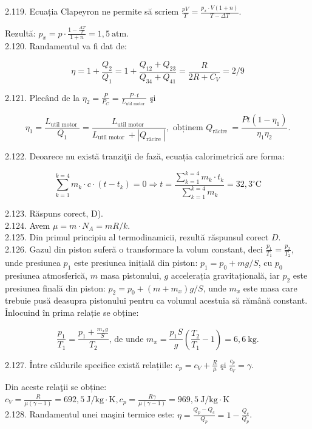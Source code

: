 \documentclass[10pt]{article}
\begin{document}
2.119. Ecuația Clapeyron ne permite să scriem $\frac{p V}{T}=\frac{p_{x} \cdot V(1+n)}{T-\Delta T}$.

Rezultă: $p_{x}=p \cdot \frac{1-\frac{\Delta T}{T}}{1+n}=1,5 \mathrm{~atm}$.\\
2.120. Randamentul va fi dat de:

$$
\eta=1+\frac{Q_{2}}{Q_{1}}=1+\frac{Q_{12}+Q_{23}}{Q_{34}+Q_{41}}=\frac{R}{2 R+C_{V}}=2 / 9
$$

2.121. Plecând de la $\eta_{2}=\frac{P}{P_{C}}=\frac{P \cdot t}{L_{\text {util motor }}}$ şi

$$
\eta_{1}=\frac{L_{\text {util motor }}}{Q_{1}}=\frac{L_{\text {util motor }}}{L_{\text {util motor }}+\left|Q_{\text {răcire }}\right|}, \text { obținem } Q_{\text {rācire }}=\frac{P t\left(1-\eta_{1}\right)}{\eta_{1} \eta_{2}} .
$$

2.122. Deoarece nu există tranziţii de fază, ecuația calorimetrică are forma:

$$
\sum_{k=1}^{k=4} m_{k} \cdot c \cdot\left(t-t_{k}\right)=0 \Rightarrow t=\frac{\sum_{k=1}^{k=4} m_{k} \cdot t_{k}}{\sum_{k=1}^{k=4} m_{k}}=32,3^{\circ} \mathrm{C}
$$

2.123. Răspuns corect, D).\\
2.124. Avem $\mu=m \cdot N_{A}=m R / k$.\\
2.125. Din primul principiu al termodinamicii, rezultă răspunsul corect $D$.\\
2.126. Gazul din piston suferă o transformare la volum constant, deci $\frac{p_{1}}{T_{1}}=\frac{p_{2}}{T_{2}}$, unde presiunea $p_{1}$ este presiunea inițială din piston: $p_{1}=p_{0}+m g / S$, cu $p_{0}$ presiunea atmosferică, $m$ masa pistonului, $g$ accelerația gravitațională, iar $p_{2}$ este presiunea finală din piston: $p_{2}=p_{0}+\left(m+m_{x}\right) g / S$, unde $m_{x}$ este masa care trebuie pusă deasupra pistonului pentru ca volumul acestuia să rămână constant. Înlocuind în prima relație se obține:

$$
\frac{p_{1}}{T_{1}}=\frac{p_{1}+\frac{m_{x} g}{S}}{T_{2}} \text {, de unde } m_{x}=\frac{p_{1} S}{g}\left(\frac{T_{2}}{T_{1}}-1\right)=6,6 \mathrm{~kg} .
$$

2.127. Între căldurile specifice există relațiile: $c_{p}=c_{V}+\frac{R}{\mu}$ şi $\frac{c_{p}}{c_{V}}=\gamma$.

Din aceste relaţii se obține:\\
$c_{V}=\frac{R}{\mu(\gamma-1)}=692,5 \mathrm{~J} / \mathrm{kg} \cdot \mathrm{K}, c_{p}=\frac{R \gamma}{\mu(\gamma-1)}=969,5 \mathrm{~J} / \mathrm{kg} \cdot \mathrm{K}$\\
2.128. Randamentul unei maşini termice este: $\eta=\frac{Q_{p}-Q_{c}}{Q_{p}}=1-\frac{Q_{c}}{Q_{p}}$.
\end{document}

